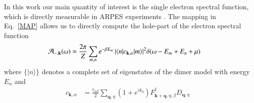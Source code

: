 \documentclass[aps,pra,reprint,showpacs,superscriptaddress]{revtex4-1}
\newcommand{\cre}[2]{{#1}^{\dagger}_{#2}}
\newcommand{\ann}[2]{{#1}^{\phantom{\dagger}}_{#2}}
\begin{document}
In this work our main quantity of interest is the single electron spectral function, which is directly measurable in ARPES experiments \cite{damascelli2003angle,shen2005nodal,hashimoto2015energy,shen1993anomalously,ding1996angle,hussain2007abrupt,vishik2012phase,vishik2010arpes}. The mapping in Eq.~\eqref{MAP} allows us to directly compute the hole-part of the electron spectral function
\begin{align}
\mathcal{A}_{-,\bold{k}}(\omega)&=  \frac{2 \pi}{Z}\sum_{m,n} e^{-\beta E_m} \, |\langle n| c_{\mathbf{k},\alpha} |m\rangle |^2 \delta(\omega - E_m + E_n + \mu)
\label{Ahole}
\end{align}
where $\{ | n \rangle \}$ denotes a complete set of eigenstates of the dimer model with energy $E_n$ and
\begin{align}
c_{\mathbf{k},\alpha} &= \frac{\epsilon_{\alpha\beta}}{2}  \sum_{\mathbf{q},\eta} \left(1+e^{i k_{\eta}} \right) \cre{F}{\mathbf{k}+\mathbf{q},\eta,\beta}  \ann{D}{\mathbf{q},\eta}  
\label{annihilK}
\end{align}
\end{document}
